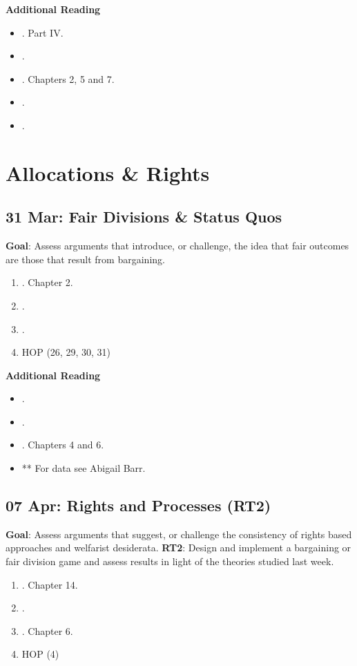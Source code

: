 \documentclass[11pt]{article}
\begin{document}
\textbf{Additional Reading}
\begin{itemize}
\item {}. Part IV.
\item {}.
\item {}. Chapters 2, 5 and 7.
\item {}.
\item {}.
\end{itemize}



\section{Allocations \& Rights}
\subsection{31 Mar: Fair Divisions \& Status Quos}
\textbf{Goal}: Assess arguments that introduce, or challenge, the idea that fair outcomes are those that result from bargaining. 
\begin{enumerate}
\item {}. Chapter 2. 
\item {}.
\item {}.
\item HOP (26, 29, 30, 31)
\end{enumerate}

\textbf{Additional Reading}
\begin{itemize}
\item {}.
\item {}.
\item {}. Chapters 4 and 6.
\item ** For data see Abigail Barr.
\end{itemize}


\subsection{07 Apr: Rights and Processes (RT2)}
\textbf{Goal}: Assess arguments that suggest, or challenge the consistency of rights based approaches and welfarist desiderata. \textbf{RT2}: Design and implement a bargaining or fair division game and assess results in light of the theories studied last week.
\begin{enumerate}
\item {}. Chapter 14.
\item {}.
\item {}. Chapter 6.
\item HOP (4)
\end{enumerate}
\end{document}
